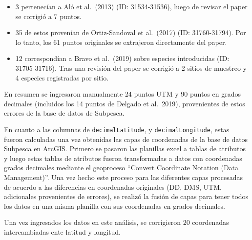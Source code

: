 \documentclass[sn-apa,pdflatex]{sn-jnl}
\newenvironment{Shaded}{\begin{snugshade}}{\end{snugshade}}
\newcommand{\CommentTok}[1]{\textcolor[rgb]{0.56,0.35,0.01}{\textit{#1}}}
\newcommand{\DecValTok}[1]{\textcolor[rgb]{0.00,0.00,0.81}{#1}}
\newcommand{\FunctionTok}[1]{\textcolor[rgb]{0.13,0.29,0.53}{\textbf{#1}}}
\newcommand{\NormalTok}[1]{#1}
\newcommand{\OtherTok}[1]{\textcolor[rgb]{0.56,0.35,0.01}{#1}}
\newcommand{\SpecialCharTok}[1]{\textcolor[rgb]{0.81,0.36,0.00}{\textbf{#1}}}
\newcommand{\StringTok}[1]{\textcolor[rgb]{0.31,0.60,0.02}{#1}}
\providecommand{\tightlist}{%
  \setlength{\itemsep}{0pt}\setlength{\parskip}{0pt}}
\begin{document}
\begin{itemize}
\tightlist
\item
  3 pertenecían a Aló et al.~(2013) (ID: 31534-31536), luego de revisar
  el paper se corrigió a 7 puntos.\\
\item
  35 de estos provenían de Ortiz-Sandoval et al.~(2017) (ID:
  31760-31794). Por lo tanto, los 61 puntos originales se extrajeron
  directamente del paper.\\
\item
  12 correspondían a Bravo et al.~(2019) sobre especies introducidas
  (ID: 31705-31716). Tras una revisión del paper se corrigió a 2 sitios
  de muestreo y 4 especies registradas por sitio.
\end{itemize}

En resumen se ingresaron manualmente 24 puntos UTM y 90 puntos en grados
decimales (incluidos los 14 puntos de Delgado et al.~2019), provenientes
de estos errores de la base de datos de Subpesca.

En cuanto a las columnas de \texttt{decimalLatitude}, y
\texttt{decimalLongitude}, estas fueron calculadas una vez obtenidas las
capas de coordenadas de la base de datos Subpesca en ArcGIS. Primero se
pasaron las planillas excel a tablas de atributos y luego estas tablas
de atributos fueron transformadas a datos con coordenadas grados
decimales mediante el geoproceso ``Convert Coordinate Notation (Data
Management)''. Una vez hecho este proceso para las diferentes capas
procesadas de acuerdo a las diferencias en coordenadas originales (DD,
DMS, UTM, adicionales provenientes de errores), se realizó la fusión de
capas para tener todos los datos en una misma planilla con sus
coordenadas en grados decimales.

Una vez ingresados los datos en este análisis, se corrigieron 20
coordenadas intercambiadas ente latitud y longitud.

\begin{Shaded}
\end{Shaded}
\end{document}
